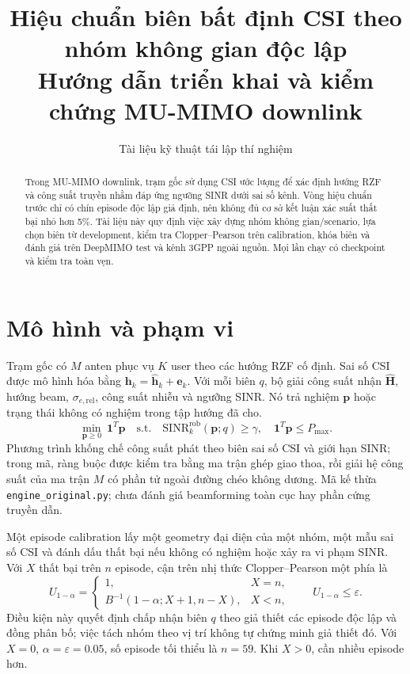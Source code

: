 \documentclass[onecolumn,11pt]{IEEEtran}
\title{Hiệu chuẩn biên bất định CSI theo nhóm không gian độc lập\\Hướng dẫn triển khai và kiểm chứng MU-MIMO downlink}
\author{Tài liệu kỹ thuật tái lập thí nghiệm}
\begin{document}
\maketitle
\begin{abstract}
Trong MU-MIMO downlink, trạm gốc sử dụng CSI ước lượng để xác định hướng RZF và công suất truyền nhằm đáp ứng ngưỡng SINR dưới sai số kênh. Vòng hiệu chuẩn trước chỉ có chín episode độc lập giả định, nên không đủ cơ sở kết luận xác suất thất bại nhỏ hơn 5\%. Tài liệu này quy định việc xây dựng nhóm không gian/scenario, lựa chọn biên từ development, kiểm tra Clopper--Pearson trên calibration, khóa biên và đánh giá trên DeepMIMO test và kênh 3GPP ngoài nguồn. Mọi lần chạy có checkpoint và kiểm tra toàn vẹn.
\end{abstract}
\section{Mô hình và phạm vi}
Trạm gốc có $M$ anten phục vụ $K$ user theo các hướng RZF cố định. Sai số CSI được mô hình hóa bằng $\mathbf h_k=\widehat{\mathbf h}_k+\mathbf e_k$. Với mỗi biên $q$, bộ giải công suất nhận $\widehat{\mathbf H}$, hướng beam, $\sigma_{e,\mathrm{rel}}$, công suất nhiễu và ngưỡng SINR. Nó trả nghiệm $\mathbf p$ hoặc trạng thái không có nghiệm trong tập hướng đã cho.
\begin{equation}
\min_{\mathbf p\ge0}\ \mathbf1^T\mathbf p\quad\text{s.t.}\quad \mathrm{SINR}^{\mathrm{rob}}_k(\mathbf p;q)\ge\gamma,\quad \mathbf1^T\mathbf p\le P_{\max}.
\end{equation}
Phương trình khống chế công suất phát theo biên sai số CSI và giới hạn SINR; trong mã, ràng buộc được kiểm tra bằng ma trận ghép giao thoa, rồi giải hệ công suất của ma trận $M$ có phần tử ngoài đường chéo không dương. Mã kế thừa \texttt{engine\_original.py}; chưa đánh giá beamforming toàn cục hay phần cứng truyền dẫn.

Một episode calibration lấy một geometry đại diện của một nhóm, một mẫu sai số CSI và đánh dấu thất bại nếu không có nghiệm hoặc xảy ra vi phạm SINR. Với $X$ thất bại trên $n$ episode, cận trên nhị thức Clopper--Pearson một phía là
\begin{equation}
U_{1-\alpha}=\begin{cases}1,& X=n,\\ B^{-1}(1-\alpha;X+1,n-X),&X<n,\end{cases}\qquad U_{1-\alpha}\le \varepsilon.
\end{equation}
Điều kiện này quyết định chấp nhận biên $q$ theo giả thiết các episode độc lập và đồng phân bố; việc tách nhóm theo vị trí không tự chứng minh giả thiết đó. Với $X=0$, $\alpha=\varepsilon=0.05$, số episode tối thiểu là $n=59$. Khi $X>0$, cần nhiều episode hơn.
\end{document}
